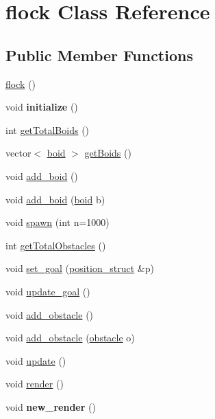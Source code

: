 \hypertarget{classflock}{}\section{flock Class Reference}
\label{classflock}
\subsection*{Public Member Functions}
\begin{DoxyCompactItemize}
\item 
\hyperlink{classflock_a0e94f2629ff36455098e9f9f966dc197}{flock} ()
\item 
void {\bfseries initialize} ()\hypertarget{classflock_aa30e2fc068a2d9ddcce536ff0a062558}{}\label{classflock_aa30e2fc068a2d9ddcce536ff0a062558}

\item 
int \hyperlink{classflock_aac5da289f9e204d1da4e9c3f1ac545e6}{get\+Total\+Boids} ()
\item 
vector$<$ \hyperlink{classboid}{boid} $>$ \hyperlink{classflock_a56acec06b68505796941a6396ccab92d}{get\+Boids} ()
\item 
void \hyperlink{classflock_af81465628a5ac3865b2ea0cc7f2836ce}{add\+\_\+boid} ()
\item 
void \hyperlink{classflock_a232951fa755f7db9c8560c3b74192179}{add\+\_\+boid} (\hyperlink{classboid}{boid} b)
\item 
void \hyperlink{classflock_a9d41f3257cd92295ff58622fe8221aa9}{spawn} (int n=1000)
\item 
int \hyperlink{classflock_adb832c76ae79f4e84a328eb5f3447549}{get\+Total\+Obstacles} ()
\item 
void \hyperlink{classflock_a75380c1879bb4edcac5c3dc89622265b}{set\+\_\+goal} (\hyperlink{structposition__struct}{position\+\_\+struct} \&p)
\item 
void \hyperlink{classflock_a27945f15e95c5de75f008aa230e7eea4}{update\+\_\+goal} ()
\item 
void \hyperlink{classflock_a1957921b331a2aedb042f42de72f42c5}{add\+\_\+obstacle} ()
\item 
void \hyperlink{classflock_a7c819292d19a57078461edc8c4e72c28}{add\+\_\+obstacle} (\hyperlink{classobstacle}{obstacle} o)
\item 
void \hyperlink{classflock_a70d50567c44353a21f33975c3298ab0d}{update} ()
\item 
void \hyperlink{classflock_a75a1375a36b7c5bff6d0fad533a06adc}{render} ()
\item 
void {\bfseries new\+\_\+render} ()\hypertarget{classflock_a3b9d8497ce325dbd1176fd3024ffb593}{}\label{classflock_a3b9d8497ce325dbd1176fd3024ffb593}

\end{DoxyCompactItemize}
